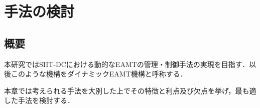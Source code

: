 \chapter{手法の検討}
\label{consideration}

\section{概要}
本研究ではSIIT-DCにおける動的なEAMTの管理・制御手法の実現を目指す．以後このような機構をダイナミックEAMT機構と呼称する．

本章では考えられる手法を大別した上でその特徴と利点及び欠点を挙げ，最も適した手法を検討する．





